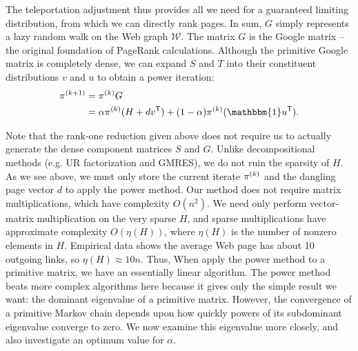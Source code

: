 \documentclass[../exploring-pagerank.tex]{subfiles}
\begin{document}
	The teleportation adjustment thus provides all we need for a guaranteed limiting distribution, from which we can directly rank pages. In sum, $G$ simply represents a lazy random walk on the Web graph $\mathcal{W}$. The matrix $G$ is the Google matrix -- the original foundation of PageRank calculations. Although the primitive Google matrix is completely dense, we can expand $S$ and $T$ into their constituent distributions $v$ and $u$ to obtain a power iteration:
    \begin{align*}
        \iterate{\pi}{k+1} &= \iterate{\pi}{k} G \\
        &= \alpha \iterate{\pi}{k} (H + d \transpose{v}) + (1 - \alpha) \iterate{\pi}{k} (\mathbbm{1} \transpose{u}).
    \end{align*}
    
    Note that the rank-one reduction given above does not require us to actually generate the dense component matrices $S$ and $G$. Unlike decompositional methods (e.g. UR factorization and GMRES), we do not ruin the sparsity of $H$. As we see above, we must only store the current iterate $\pi^{(k)}$ and the dangling page vector $d$ to apply the power method. Our method does not require matrix multiplications, which have complexity $O(n^2)$. We need only perform vector-matrix multiplication on the very sparse $H$, and sparse multiplications have approximate complexity $O(\eta(H))$, where $\eta(H)$ is the number of nonzero elements in $H$. Empirical data shows the average Web page has about 10 outgoing links, so $\eta(H) \approx 10n$. Thus, When apply the power method to a primitive matrix, we have an essentially linear algorithm. The power method beats more complex algorithms here because it gives only the simple result we want: the dominant eigenvalue of a primitive matrix. However, the convergence of a primitive Markov chain depends upon how quickly powers of its subdominant eigenvalue converge to zero. We now examine this eigenvalue more closely, and also investigate an optimum value for $\alpha$.
    
\end{document}
